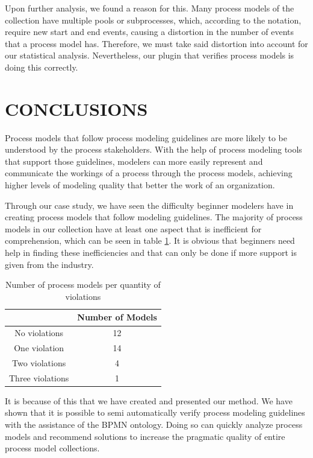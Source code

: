 \documentclass[a4paper,twoside]{article}
\begin{document}
Upon further analysis, we found a reason for this. Many process models of the collection have multiple pools or subprocesses, which, according to the notation, require new start and end events, causing a distortion in the number of events that a process model has. Therefore, we must take said distortion into account for our statistical analysis. Nevertheless, our plugin that verifies process models is doing this correctly.





\section{CONCLUSIONS}\label{Conclusion}

\noindent Process models that follow process modeling guidelines are more likely to be understood by the process stakeholders. With the help of process modeling tools that support those guidelines, modelers can more easily represent and communicate the workings of a process through the process models, achieving higher levels of modeling quality that better the work of an organization.

Through our case study, we have seen the difficulty beginner modelers have in creating process models that follow modeling guidelines. The majority of process models in our collection have at least one aspect that is inefficient for comprehension, which can be seen in table \ref{ModelsPerQuantityOfViolation}. It is obvious that beginners need help in finding these inefficiencies and that can only be done if more support is given from the industry.

\begin{table}[]
	\centering
	\caption{Number of process models per quantity of violations}
	\label{ModelsPerQuantityOfViolation}
	\begin{tabular}{|c|c|}
		\hline
		& Number of Models \\ \hline
		No violations & 12 \\ \hline
		One violation & 14 \\ \hline
		Two violations & 4 \\ \hline
		Three violations & 1 \\ \hline
	\end{tabular}
\end{table}

It is because of this that we have created and presented our method. We have shown that it is possible to semi automatically verify process modeling guidelines with the assistance of the BPMN ontology. Doing so can quickly analyze process models and recommend solutions to increase the pragmatic quality of entire process model collections. %
\end{document}
